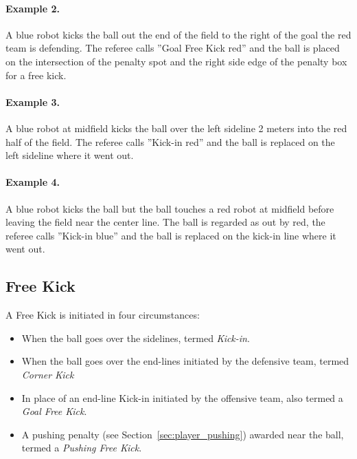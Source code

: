 \documentclass[12pt]{article}
\begin{document}
\paragraph{Example 2.} A blue robot kicks the ball out the end of the field to the right of the goal the red team is defending. The referee calls ''Goal Free Kick red'' and the ball is placed on the intersection of the penalty spot and the right side edge of the penalty box for a free kick.

\paragraph{Example 3.} A blue robot at midfield kicks the ball over the left sideline 2 meters into the red half of the field. The referee calls ''Kick-in red'' and the ball is replaced on the left sideline where it went out.

\paragraph{Example 4.} A blue robot kicks the ball but the ball touches a red robot at midfield before leaving the field near the center line. The ball is regarded as out by red, the referee calls ''Kick-in blue'' and the ball is replaced on the kick-in line where it went out.

\subsection{Free Kick}
\label{sec:free_kick}

A Free Kick is initiated in four circumstances:
\begin{itemize}
  \item When the ball goes over the sidelines, termed \emph{Kick-in}.
  \item When the ball goes over the end-lines initiated by the defensive team, termed \emph{Corner Kick}
  \item In place of an end-line Kick-in initiated by the offensive team, also termed a \emph{Goal Free Kick}.
  \item A pushing penalty (see Section~\ref{sec:player_pushing}) awarded near the ball, termed a \emph{Pushing Free Kick}.
\end{itemize}
\end{document}
